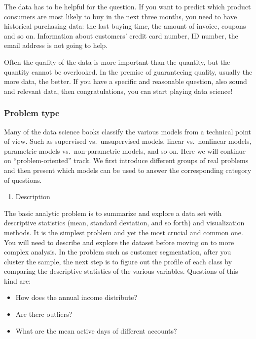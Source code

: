 \documentclass[12pt,]{krantz}
\providecommand{\tightlist}{%
  \setlength{\itemsep}{0pt}\setlength{\parskip}{0pt}}
\theoremstyle{definition}
\theoremstyle{definition}
\theoremstyle{definition}
\theoremstyle{remark}
\begin{document}
The data has to be helpful for the question. If you want to predict
which product consumers are most likely to buy in the next three months,
you need to have historical purchasing data: the last buying time, the
amount of invoice, coupons and so on. Information about customers'
credit card number, ID number, the email address is not going to help.

Often the quality of the data is more important than the quantity, but
the quantity cannot be overlooked. In the premise of guaranteeing
quality, usually the more data, the better. If you have a specific and
reasonable question, also sound and relevant data, then congratulations,
you can start playing data science!

\subsubsection{Problem type}\label{problem-type}

Many of the data science books classify the various models from a
technical point of view. Such as supervised vs.~unsupervised models,
linear vs.~nonlinear models, parametric models vs.~non-parametric
models, and so on. Here we will continue on ``problem-oriented'' track.
We first introduce different groups of real problems and then present
which models can be used to answer the corresponding category of
questions.

\begin{enumerate}
\def\labelenumi{\arabic{enumi}.}
\tightlist
\item
  Description
\end{enumerate}

The basic analytic problem is to summarize and explore a data set with
descriptive statistics (mean, standard deviation, and so forth) and
visualization methods. It is the simplest problem and yet the most
crucial and common one. You will need to describe and explore the
dataset before moving on to more complex analysis. In the problem such
as customer segmentation, after you cluster the sample, the next step is
to figure out the profile of each class by comparing the descriptive
statistics of the various variables. Questions of this kind are:

\begin{itemize}
\tightlist
\item
  How does the annual income distribute?
\item
  Are there outliers?
\item
  What are the mean active days of different accounts?
\end{itemize}
\end{document}

